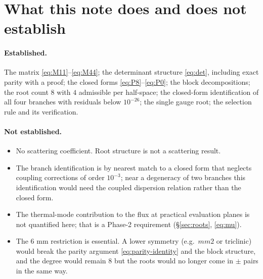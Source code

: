 \documentclass[11pt]{article}
\theoremstyle{plain}
\begin{document}
\section{What this note does and does not establish}
\label{sec:summary}

\paragraph{Established.} The matrix \eqref{eq:M11}--\eqref{eq:M44}; the
determinant structure \eqref{eq:det}, including exact parity with a
proof; the closed forms \eqref{eq:P8}--\eqref{eq:P0}; the block decompositions;
the root count $8$ with $4$ admissible per half-space; the closed-form
identification of all four branches with residuals below $10^{-26}$; the single
gauge root; the selection rule and its verification.

\paragraph{Not established.}
\begin{itemize}
  \item No scattering coefficient. Root structure is not a scattering result.
  \item The branch identification is by nearest match to a closed form that
        neglects coupling corrections of order $10^{-3}$; near a degeneracy of two
        branches this identification would need the coupled dispersion relation
        rather than the closed form.
  \item The thermal-mode contribution to the flux at practical evaluation planes
        is not quantified here; that is a Phase-2 requirement
        (\S\ref{sec:roots}, \eqref{eq:mu}).
  \item The 6 mm restriction is essential. A lower symmetry (e.g.\ $mm2$ or
        triclinic) would break the parity argument \eqref{eq:parity-identity} and
        the block structure, and the degree would remain $8$ but the roots would
        no longer come in $\pm$ pairs in the same way.
\end{itemize}
\end{document}
